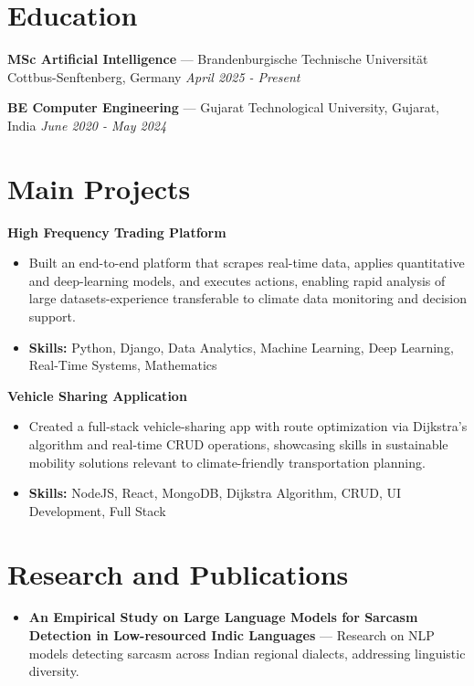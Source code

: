 \documentclass[a4paper,10pt]{article}
\begin{document}
\section*{Education}
\textbf{MSc Artificial Intelligence} — Brandenburgische Technische Universität Cottbus-Senftenberg, Germany \hfill \textit{April 2025 - Present}\par
\vspace{1.5pt}
\textbf{BE Computer Engineering} — Gujarat Technological University, Gujarat, India \hfill \textit{June 2020 - May 2024}\par

\section*{Main Projects}
\textbf{High Frequency Trading Platform}\par
\vspace{1pt}
\begin{itemize}
  \item Built an end-to-end platform that scrapes real-time data, applies quantitative and deep-learning models, and executes actions, enabling rapid analysis of large datasets-experience transferable to climate data monitoring and decision support.
  \item \textbf{Skills:} Python, Django, Data Analytics, Machine Learning, Deep Learning, Real-Time Systems, Mathematics
\end{itemize}
\vspace{3pt}
\textbf{Vehicle Sharing Application}\par
\vspace{1pt}
\begin{itemize}
  \item Created a full-stack vehicle-sharing app with route optimization via Dijkstra's algorithm and real-time CRUD operations, showcasing skills in sustainable mobility solutions relevant to climate-friendly transportation planning.
  \item \textbf{Skills:} NodeJS, React, MongoDB, Dijkstra Algorithm, CRUD, UI Development, Full Stack
\end{itemize}

\section*{Research and Publications}
\begin{itemize}
\item \textbf{An Empirical Study on Large Language Models for Sarcasm Detection in Low-resourced Indic Languages} — Research on NLP models detecting sarcasm across Indian regional dialects, addressing linguistic diversity.
\end{itemize}
\end{document}
